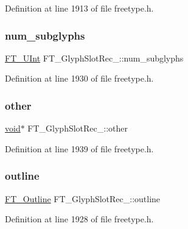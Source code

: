 Definition at line 1913 of file freetype.\+h.

\mbox{\label{struct_f_t___glyph_slot_rec___a5753b48d7165b08f106de3ad7c12bdd7}} 
\subsubsection{\texorpdfstring{num\_subglyphs}{num\_subglyphs}}
{\footnotesize\ttfamily \mbox{\hyperlink{fttypes_8h_abcb8db4dbf35d2b55a9e8c7b0926dc52}{F\+T\+\_\+\+U\+Int}} F\+T\+\_\+\+Glyph\+Slot\+Rec\+\_\+\+::num\+\_\+subglyphs}



Definition at line 1930 of file freetype.\+h.

\mbox{\label{struct_f_t___glyph_slot_rec___ad0c5ab51842f178ba571bab2874f1bdb}} 
\subsubsection{\texorpdfstring{other}{other}}
{\footnotesize\ttfamily \mbox{\hyperlink{_s_d_l__opengles2__gl2ext_8h_ae5d8fa23ad07c48bb609509eae494c95}{void}}$\ast$ F\+T\+\_\+\+Glyph\+Slot\+Rec\+\_\+\+::other}



Definition at line 1939 of file freetype.\+h.

\mbox{\label{struct_f_t___glyph_slot_rec___a8e46dd5d808079bdcba68056d6476d8d}} 
\subsubsection{\texorpdfstring{outline}{outline}}
{\footnotesize\ttfamily \mbox{\hyperlink{ftimage_8h_a79cb182373b5aa3041955b19ce32afca}{F\+T\+\_\+\+Outline}} F\+T\+\_\+\+Glyph\+Slot\+Rec\+\_\+\+::outline}



Definition at line 1928 of file freetype.\+h.

